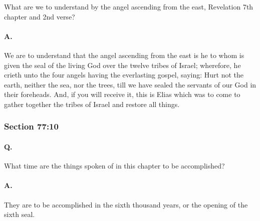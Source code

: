 			What are we to understand by the angel ascending from the east, Revelation 7th chapter and 2nd verse?

		\paragraph{A.}
		
			We are to understand that the angel ascending from the east is he to whom is given the seal of the living God over the twelve tribes of Israel; wherefore, he crieth unto the four angels having the everlasting gospel, saying: Hurt not the earth, neither the sea, nor the trees, till we have sealed the servants of our God in their foreheads.  And, if you will receive it, this is Elias which was to come to gather together the tribes of Israel and restore all things.


	\subsubsection{Section 77:10} %
		\label{DC77-10}

		\paragraph{Q.}

			What time are the things spoken of in this chapter to be accomplished?

		\paragraph{A.}
		
			They are to be accomplished in the sixth thousand years, or the opening of the sixth seal.


